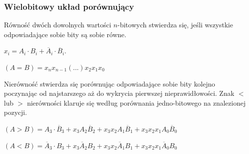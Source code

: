 \documentclass[a4paper,12pt]{article}
\begin{document}
\subsubsection{Wielobitowy układ porównujący}

Równość dwóch dowolnych wartości $n$-bitowych stwierdza się, jeśli wszystkie odpowiadające sobie bity są sobie równe.

$x_i= A_i \cdot B_i + \overline{A}_i \cdot \overline{B}_i.$

$(A=B) = x_nx_{n-1} (...) x_2x_1x_0$

Nierówność stwierdza się porównując odpowiadające sobie bity kolejno poczynając od najstarszego aż do wykrycia pierwszej nieprawidłowości. Znak $<$ lub $>$ nierówności klaruje się według porównania jedno-bitowego na znalezionej pozycji.

$(A>B)=A_3 \cdot \overline{B}_3+x_3 A_2 \overline{B}_2+x_3 x_2 A_1 \overline{B}_1+x_3x_2x_1 A_0 \overline{B}_0$

$(A<B)=\overline{A}_3 \cdot B_3+x_3 \overline{A}_2 B_2+x_3 x_2 \overline{A}_1 B_1+x_3x_2x_1 \overline{A}_0 B_0$
\end{document}
